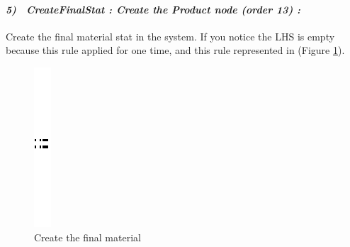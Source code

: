 \paragraph{\emph{5)~ CreateFinalStat : Create the Product node (order 13) :} }
Create the final material stat in the system. If you notice the LHS is empty because this rule applied for one time, and this rule represented in
(Figure \ref{fig:Create the final material}).
 
\begin{figure}[th]
\centering
	\quad{}
		\includegraphics{ch3/img/sep}
	\quad{}
\caption{\label{fig:Create the final material}Create the final material}
 
\end{figure} 
\pagebreak
